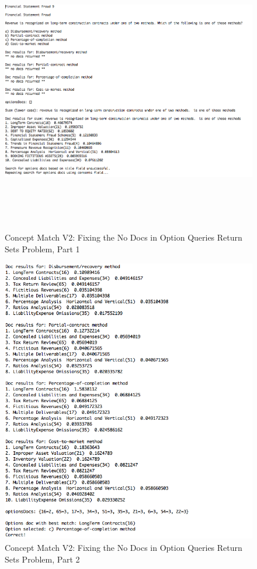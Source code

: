 \begin{figure}
\centering
\vspace{1.0in}
\includegraphics[width=125mm, height=125mm]{concept_match_v2_financial_statement_fraud_9_1.png}
\caption{Concept Match V2: Fixing the No Docs in Option Queries Return Sets Problem, Part 1}
\label{fig:concept_match_v2_financial_statement_fraud_9_1}
\end{figure}

\begin{figure}
\centering
\vspace{1.0in}
\includegraphics[width=125mm, height=125mm]{concept_match_v2_financial_statement_fraud_9_2.png}
\caption{Concept Match V2: Fixing the No Docs in Option Queries Return Sets Problem, Part 2}
\label{fig:concept_match_v2_financial_statement_fraud_9_2}
\end{figure}

